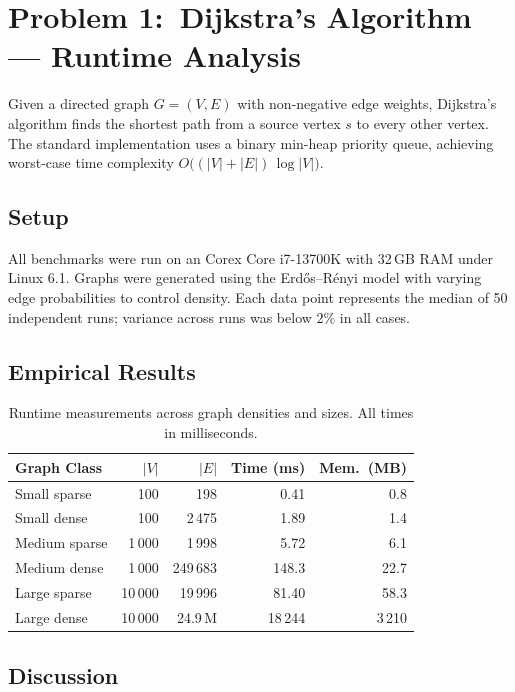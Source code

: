 \section{Problem 1:\ Dijkstra's Algorithm --- Runtime Analysis}

Given a directed graph $G = (V, E)$ with non-negative edge weights, Dijkstra's algorithm finds
the shortest path from a source vertex $s$ to every other vertex. The standard implementation
uses a binary min-heap priority queue, achieving worst-case time complexity
$O\big((|V| + |E|)\,\log|V|\big)$.

\subsection{Setup}

All benchmarks were run on an Corex Core i7-13700K with 32\,GB RAM under Linux 6.1. Graphs were
generated using the Erd\H{o}s--R\'enyi model with varying edge probabilities to control density.
Each data point represents the median of 50 independent runs; variance across runs was below
$2\%$ in all cases.

\subsection{Empirical Results}

\begin{table}[h]
  \centering
  \caption{Runtime measurements across graph densities and sizes. All times in milliseconds.}
  \label{tab:runtimes}
  \begin{tabular}{@{}lrrrr@{}}
    \toprule
    \textbf{Graph Class} & \textbf{$|V|$} & \textbf{$|E|$} & \textbf{Time (ms)} & \textbf{Mem.\ (MB)} \\
    \midrule
    Small sparse   & 100   & 198       & 0.41  & 0.8  \\
    Small dense    & 100   & 2\,475    & 1.89  & 1.4  \\
    Medium sparse  & 1\,000  & 1\,998    & 5.72  & 6.1  \\
    Medium dense   & 1\,000  & 249\,683  & 148.3 & 22.7 \\
    Large sparse   & 10\,000 & 19\,996   & 81.40 & 58.3 \\
    Large dense    & 10\,000 & 24.9\,M   & 18\,244 & 3\,210 \\
    \bottomrule
  \end{tabular}
\end{table}

\subsection{Discussion}

